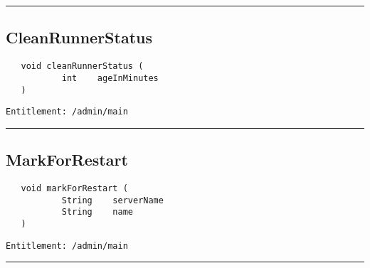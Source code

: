 \rule{12cm}{2pt}
\subsection{CleanRunnerStatus}
\label{Api:CleanRunnerStatus}
\begin{Verbatim}
   void cleanRunnerStatus (
           int    ageInMinutes
   )
\end{Verbatim}
\begin{Verbatim}[formatcom=\color{Maroon}]
  Entitlement: /admin/main
\end{Verbatim}



\rule{12cm}{2pt}
\subsection{MarkForRestart}
\label{Api:MarkForRestart}
\begin{Verbatim}
   void markForRestart (
           String    serverName
           String    name
   )
\end{Verbatim}
\begin{Verbatim}[formatcom=\color{Maroon}]
  Entitlement: /admin/main
\end{Verbatim}



\rule{12cm}{2pt}
